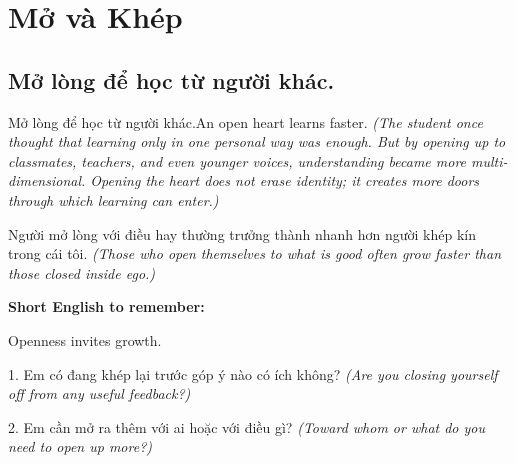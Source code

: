 \chapter{Mở và Khép}

\section{Mở lòng để học từ người khác.}
\begin{truyen}{Mở lòng để học từ người khác.}{An open heart learns faster.}
\textit{(The student once thought that learning only in one personal way was enough. But by opening up to classmates, teachers, and even younger voices, understanding became more multi-dimensional. Opening the heart does not erase identity; it creates more doors through which learning can enter.)}
\end{truyen}
\begin{baihoc}
Người mở lòng với điều hay thường trưởng thành nhanh hơn người khép kín trong cái tôi.
\textit{(Those who open themselves to what is good often grow faster than those closed inside ego.)}
\end{baihoc}
\begin{ghinhoanh}
\textbf{Short English to remember:}

Openness invites growth.
\end{ghinhoanh}
\begin{tuhocnhanh}
1. Em có đang khép lại trước góp ý nào có ích không? \textit{(Are you closing yourself off from any useful feedback?)}

2. Em cần mở ra thêm với ai hoặc với điều gì? \textit{(Toward whom or what do you need to open up more?)}
\end{tuhocnhanh}
\ngancach

